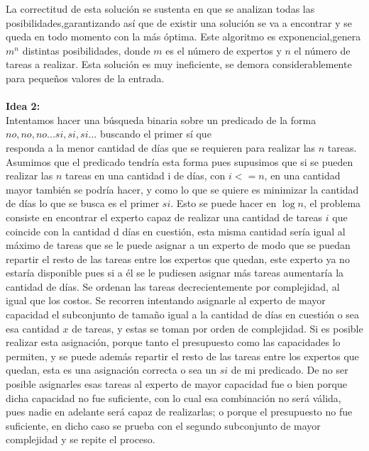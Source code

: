\documentclass[10pt,letterpaper]{article}
\begin{document}
{ 	La correctitud de esta soluci\'on se sustenta en que se analizan todas las posibilidades,garantizando as\'i que de existir una soluci\'on se va a encontrar y se queda en todo momento con la m\'as \'optima. Este algoritmo es exponencial,genera $m^{n}$ distintas posibilidades, donde  $m$ es el n\'umero de expertos y $n$ el n\'umero de tareas a realizar. Esta soluci\'on es muy ineficiente, se demora considerablemente para peque\~nos valores de la entrada.\\ \\
 	
 	
 	{\Large \bf Idea 2:}\\
 	
 	Intentamos hacer una b\'usqueda binaria sobre un predicado de la forma $no,no,no...si,si,si...$ buscando el primer s\'i que \\ responda a la menor cantidad de d\'ias que se requieren para realizar las $n$ tareas. Asumimos que el predicado tendr\'ia esta forma pues supusimos que si se pueden realizar las $n$ tareas en una cantidad i de d\'ias, con $i <= n$, en una cantidad mayor tambi\'en se podr\'ia hacer, y como lo que se quiere es minimizar la cantidad de d\'ias lo que se busca es el primer $si$. Esto se puede hacer en $\log n$, el problema consiste en encontrar el experto capaz de realizar una cantidad de tareas $i$ que coincide con la cantidad d d\'ias en cuesti\'on, esta misma cantidad ser\'ia igual al m\'aximo de tareas que se le puede asignar a un experto de modo que se puedan repartir el resto de las tareas entre los expertos que quedan, este experto ya no estar\'ia disponible pues si a \'el se le pudiesen asignar m\'as tareas aumentar\'ia la cantidad de d\'ias. 
 	Se ordenan las tareas decrecientemente por complejidad, al igual que los costos. Se recorren intentando asignarle al experto de mayor capacidad el subconjunto de tama\~no igual a la cantidad de d\'ias en cuesti\'on o sea esa cantidad $x$ de tareas, y estas se toman por orden de complejidad. Si es posible realizar esta asignaci\'on, porque tanto el presupuesto como las capacidades lo permiten, y se puede adem\'as repartir el resto de las tareas entre los expertos que quedan, esta es una asignaci\'on correcta o sea un $si$ de mi predicado. De no ser posible asignarles esas tareas al experto de mayor capacidad fue o bien porque dicha capacidad no fue suficiente, con lo cual esa combinaci\'on no ser\'a v\'alida, pues nadie en adelante ser\'a capaz de realizarlas; o porque el presupuesto no fue suficiente, en dicho caso se prueba con el segundo subconjunto de mayor complejidad y se repite el proceso.\\
 	
}
\end{document}

